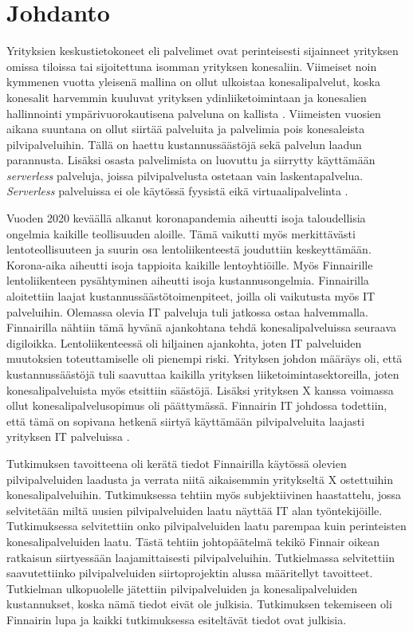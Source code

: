 \chapter{Johdanto\label{johdanto}}
Yrityksien keskustietokoneet eli palvelimet ovat perinteisesti sijainneet yrityksen omissa tiloissa tai sijoitettuna isomman yrityksen konesaliin. Viimeiset noin kymmenen vuotta yleisenä mallina on ollut ulkoistaa konesalipalvelut, koska konesalit harvemmin kuuluvat yrityksen ydinliiketoimintaan ja konesalien hallinnointi ympärivuorokautisena palveluna on kallista \citep{data_center_outsourcing}. Viimeisten vuosien aikana suuntana on ollut siirtää palveluita ja palvelimia pois konesaleista pilvipalveluihin. Tällä on haettu kustannussäästöjä sekä palvelun laadun parannusta. Lisäksi osasta palvelimista on luovuttu ja siirrytty käyttämään \emph{serverless} palveluja, joissa pilvipalvelusta ostetaan vain laskentapalvelua. \emph{Serverless} palveluissa ei ole käytössä fyysistä eikä virtuaalipalvelinta \citep{serverless_computing}.

Vuoden 2020 keväällä alkanut koronapandemia aiheutti isoja taloudellisia ongelmia kaikille teollisuuden aloille. Tämä vaikutti myös merkittävästi lentoteollisuuteen ja suurin osa lentoliikenteestä jouduttiin keskeyttämään. Korona-aika aiheutti isoja tappioita kaikille lentoyhtiöille. Myös Finnairille lentoliikenteen pysähtyminen aiheutti isoja kustannusongelmia. Finnairilla aloitettiin laajat kustannussäästötoimenpiteet, joilla oli vaikutusta myös IT palveluihin. Olemassa olevia IT palveluja tuli jatkossa ostaa halvemmalla. Finnairilla nähtiin tämä hyvänä ajankohtana tehdä konesalipalveluissa seuraava digiloikka. Lentoliikenteessä oli hiljainen ajankohta, joten IT palveluiden muutoksien toteuttamiselle oli pienempi riski. Yrityksen johdon määräys oli, että kustannussäästöjä tuli saavuttaa kaikilla yrityksen liiketoimintasektoreilla, joten konesalipalveluista myös etsittiin säästöjä. Lisäksi yrityksen X kanssa voimassa ollut konesalipalvelusopimus oli päättymässä. Finnairin IT johdossa todettiin, että tämä on sopivana hetkenä siirtyä käyttämään pilvipalveluita laajasti yrityksen IT palveluissa \citep{finnair_use_ibm}.

Tutkimuksen tavoitteena oli kerätä tiedot Finnairilla käytössä olevien pilvipalveluiden laadusta ja verrata niitä aikaisemmin yritykseltä X ostettuihin konesalipalveluihin. Tutkimuksessa tehtiin myös subjektiivinen haastattelu, jossa selvitetään miltä uusien pilvipalveluiden laatu näyttää IT alan työntekijöille. Tutkimuksessa selvitettiin onko pilvipalveluiden laatu parempaa kuin perinteisten konesalipalveluiden laatu. Tästä tehtiin johtopäätelmä tekikö Finnair oikean ratkaisun siirtyessään laajamittaisesti pilvipalveluihin. Tutkielmassa selvitettiin saavutettiinko pilvipalveluiden siirtoprojektin alussa määritellyt tavoitteet. Tutkielman ulkopuolelle jätettiin pilvipalveluiden ja konesalipalveluiden kustannukset, koska nämä tiedot eivät ole julkisia. Tutkimuksen tekemiseen oli Finnairin lupa ja kaikki tutkimuksessa esiteltävät tiedot ovat julkisia.

